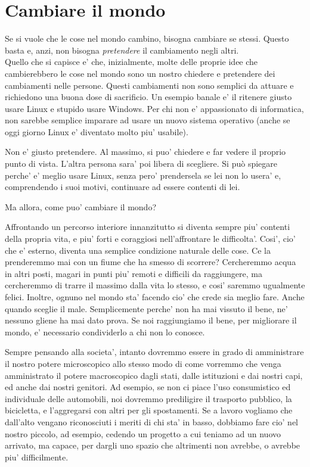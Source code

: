 \chapter{Cambiare il mondo}

Se si vuole che le cose nel mondo cambino, bisogna cambiare se stessi. Questo basta e, anzi, non bisogna \emph{pretendere} il cambiamento negli altri.\\

Quello che si capisce e' che, inizialmente, molte delle proprie idee che cambierebbero le cose nel mondo sono un nostro chiedere e pretendere dei cambiamenti nelle persone. Questi cambiamenti non sono semplici da attuare e richiedono una buona dose di sacrificio. Un esempio banale e' il ritenere giusto usare Linux e stupido usare Windows. Per chi non e' appassionato di informatica, non sarebbe semplice imparare ad usare un nuovo sistema operativo (anche se oggi giorno Linux e' diventato molto piu' usabile).

Non e' giusto pretendere. Al massimo, si puo' chiedere e far vedere il proprio punto di vista. L'altra persona sara' poi libera di scegliere. Si può spiegare perche' e' meglio usare Linux, senza pero' prendersela se lei non lo usera' e, comprendendo i suoi motivi, continuare ad essere contenti di lei.

Ma allora, come puo' cambiare il mondo?

Affrontando un percorso interiore innanzitutto si diventa sempre piu' contenti della propria vita, e piu' forti e coraggiosi nell'affrontare le difficolta'. Cosi', cio' che e' esterno, diventa una semplice condizione naturale delle cose. Ce la prenderemmo mai con un fiume che ha smesso di scorrere? Cercheremmo acqua in altri posti, magari in punti piu' remoti e difficili da raggiungere, ma cercheremmo di trarre il massimo dalla vita lo stesso, e cosi' saremmo ugualmente felici. 
Inoltre, ognuno nel mondo sta' facendo cio' che crede sia meglio fare. Anche quando sceglie il male. Semplicemente perche' non ha mai vissuto il bene, ne' nessuno gliene ha mai dato prova. 
Se noi raggiungiamo il bene, per migliorare il mondo, e' necessario condividerlo a chi non lo conosce.

Sempre pensando alla societa', intanto dovremmo essere in grado di amministrare il nostro potere microscopico allo stesso modo di come vorremmo che venga amministrato il potere macroscopico dagli stati, dalle istituzioni e dai nostri capi, ed anche dai nostri genitori.
Ad esempio, se non ci piace l'uso consumistico ed individuale delle automobili, noi dovremmo prediligire il trasporto pubblico, la bicicletta, e l'aggregarsi con altri per gli spostamenti.
Se a lavoro vogliamo che dall'alto vengano riconosciuti i meriti di chi sta' in basso, dobbiamo fare cio' nel nostro piccolo, ad esempio, cedendo un progetto a cui teniamo ad un nuovo arrivato, ma capace, per dargli uno spazio che altrimenti non avrebbe, o avrebbe piu' difficilmente.

